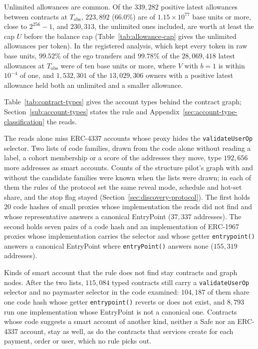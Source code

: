 Unlimited allowances are common. Of the $339{,}282$ positive latest allowances between contracts at $T_{\mathrm{obs}}$, $223{,}892$ ($66.0\%$) are of $1.15\times10^{77}$ base units or more, close to $2^{256}-1$, and $230{,}313$, the unlimited ones included, are worth at least the cap $U$ before the balance cap (Table~\ref{tab:allowance-cap} gives the unlimited allowances per token). In the registered analysis, which kept every token in raw base units, $99.52\%$ of the ego transfers and $99.78\%$ of the $28{,}069{,}418$ latest allowances at $T_{\mathrm{obs}}$ were of ten base units or more, where $V$ with $b=1$ is within $10^{-4}$ of one, and $1{,}532{,}301$ of the $13{,}029{,}306$ owners with a positive latest allowance held both an unlimited and a smaller allowance.


Table~\ref{tab:contract-types} gives the account types behind the contract graph; Section~\ref{sub:account-types} states the rule and Appendix~\ref{sec:account-type-classification} the reads.



The reads alone miss ERC-4337 accounts whose proxy hides the \texttt{validateUserOp} selector. Two lists of code families, drawn from the code alone without reading a label, a cohort membership or a score of the addresses they move, type $192{,}656$ more addresses as smart accounts. Counts of the structure pilot's graph with and without the candidate families were known when the lists were drawn; in each of them the rules of the protocol set the same reveal mode, schedule and hot-set share, and the stop flag stayed (Section~\ref{sec:discovery-protocol}). The first holds $20$ code hashes of small proxies whose implementation the reads did not find and whose representative answers a canonical EntryPoint ($37{,}337$ addresses). The second holds seven pairs of a code hash and an implementation of ERC-1967 proxies whose implementation carries the selector and whose getter \texttt{entrypoint()} answers a canonical EntryPoint where \texttt{entryPoint()} answers none ($155{,}319$ addresses).

Kinds of smart account that the rule does not find stay contracts and graph nodes. After the two lists, $115{,}084$ typed contracts still carry a \texttt{validateUserOp} selector and no paymaster selector in the code examined: $104{,}187$ of them share one code hash whose getter \texttt{entrypoint()} reverts or does not exist, and $8{,}793$ run one implementation whose EntryPoint is not a canonical one. Contracts whose code suggests a smart account of another kind, neither a Safe nor an ERC-4337 account, stay as well, as do the contracts that services create for each payment, order or user, which no rule picks out.

